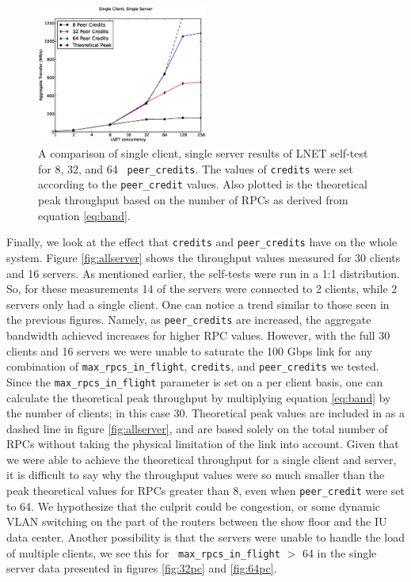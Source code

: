 \documentclass[]{sigplan-proc}
\begin{document}
\begin{figure}
\centering
\includegraphics[width=0.50\textwidth]{figures/ss_plot.eps}
\caption{A comparison of single client, single server results of LNET self-test for 8, 32, and 64 {\tt
    peer\_credits}. The values of {\tt credits} were set according to the {\tt peer\_credit} values. Also
  plotted is the theoretical peak throughput based on the number of RPCs as derived from equation \ref{eq:band}.}
\label{fig:singleserver}
\end{figure}

Finally, we look at the effect that {\tt credits} and {\tt peer\_credits} have on the whole system. Figure
\ref{fig:allserver} shows the throughput values measured for 30 clients and 16 servers. As mentioned earlier,
the self-tests were run in a 1:1 distribution. So, for these measurements 14 of the servers were connected to
2 clients, while 2 servers only had a single client. One can notice a trend similar to those seen in the
previous figures. Namely, as {\tt peer\_credits} are increased, the aggregate bandwidth achieved increases for
higher RPC values. However, with the full 30 clients and 16 servers we were unable to saturate the 100 Gbps
link for any combination of {\tt max\_rpcs\_in\_flight}, {\tt credits}, and {\tt peer\_credits} we
tested. Since the {\tt max\_rpcs\_in\_flight} parameter is set on a per client basis, one can calculate the
theoretical peak throughput by multiplying equation \ref{eq:band} by the number of clients; in this case
30. Theoretical peak values are included in as a dashed line in figure \ref{fig:allserver}, and are based
solely on the total number of RPCs without taking the physical limitation of the link into account. Given that
we were able to achieve the theoretical throughput for a single client and server, it is difficult to say why
the throughput values were so much smaller than the peak theoretical values for RPCs greater than 8, even when
{\tt peer\_credit} were set to 64. We hypothesize that the culprit could be congestion, or some dynamic VLAN
switching on the part of the routers between the show floor and the IU data center. Another possibility is
that the servers were unable to handle the load of multiple clients, we see this for {\tt
  max\_rpcs\_in\_flight} $>$ 64 in the single server data presented in figures \ref{fig:32pc} and
\ref{fig:64pc}.
\end{document}
